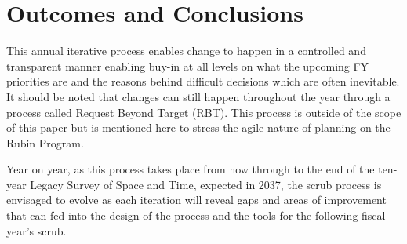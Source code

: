 \section{Outcomes and Conclusions} \label{sec:outcomes}

This annual iterative process enables change to happen in a controlled and transparent manner enabling buy-in at all levels on what the upcoming FY priorities are and the reasons behind difficult decisions which are often inevitable. It should be noted that changes can still happen throughout the year through a process called Request Beyond Target (RBT). This process is outside of the scope of this paper but is mentioned here to stress the agile nature of planning on the Rubin Program.

Year on year, as this process takes place from now through to the end of the ten-year Legacy Survey of Space and Time, expected in 2037, the scrub process is envisaged to evolve as each iteration will reveal gaps and areas of improvement that can fed into the design of the process and the tools for the following fiscal year’s scrub.
